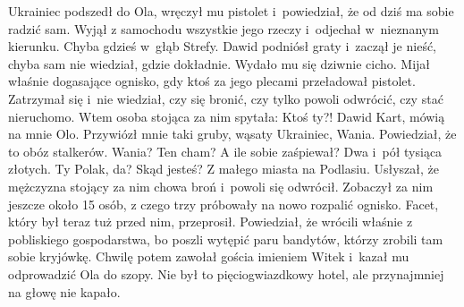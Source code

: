 \documentclass[../MAIN.tex]{subfiles}
\begin{document}
Ukrainiec podszedł do Ola, wręczył mu pistolet i~powiedział, że od dziś ma sobie
radzić sam. Wyjął z samochodu wszystkie jego rzeczy i~odjechał w~nieznanym
kierunku. Chyba gdzieś w~głąb Strefy. Dawid podniósł graty i~zaczął je nieść,
chyba sam nie wiedział, gdzie dokładnie. Wydało mu się dziwnie cicho. Mijał
właśnie dogasające ognisko, gdy ktoś za jego plecami przeładował pistolet.
Zatrzymał się i~nie wiedział, czy się bronić, czy tylko powoli odwrócić, czy
stać nieruchomo. Wtem osoba stojąca za nim spytała:
\dd
\sd
\xx Ktoś ty?!
\xx Dawid Kart, mówią na mnie Olo. Przywiózł mnie taki gruby, wąsaty Ukrainiec,
Wania. Powiedział, że to obóz stalkerów.
\xx Wania? Ten cham? A ile sobie zaśpiewał?
\xx Dwa i~pół tysiąca złotych.
\xx Ty Polak, da? Skąd jesteś?
\xx Z małego miasta na Podlasiu.
\qd
\hspace{14.1em}
Usłyszał, że mężczyzna stojący za nim chowa broń i~powoli się odwrócił. Zobaczył
za nim jeszcze około 15 osób, z czego trzy próbowały na nowo rozpalić ognisko.
Facet, który był teraz tuż przed nim, przeprosił. Powiedział, że wrócili właśnie
z pobliskiego gospodarstwa, bo poszli wytępić paru bandytów, którzy zrobili tam
sobie kryjówkę. Chwilę potem zawołał gościa imieniem Witek i~kazał mu
odprowadzić Ola do szopy. Nie był to pięciogwiazdkowy hotel, ale przynajmniej na
głowę nie kapało.
\end{document}
